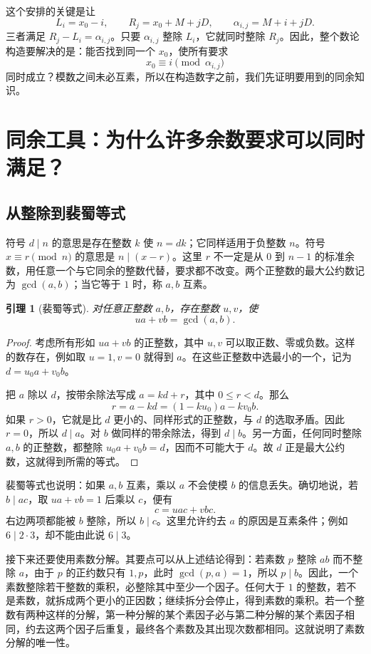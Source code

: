 \documentclass[UTF8,a4paper,oneside,openany,fontset=fandol,zihao=-4]{ctexbook}
\theoremstyle{guide}
\newtheorem{lemma}[theorem]{引理}
\begin{document}
这个安排的关键是让
\[
L_i=x_0-i,\qquad R_j=x_0+M+jD,\qquad
\alpha_{i,j}=M+i+jD.
\]
三者满足 $R_j-L_i=\alpha_{i,j}$。只要 $\alpha_{i,j}$ 整除 $L_i$，它就同时整除 $R_j$。因此，整个数论构造要解决的是：能否找到同一个 $x_0$，使所有要求
\[
x_0\equiv i\pmod{\alpha_{i,j}}
\]
同时成立？模数之间未必互素，所以在构造数字之前，我们先证明要用到的同余知识。

\section{同余工具：为什么许多余数要求可以同时满足？}\label{up:crt-tools}

\subsection{从整除到裴蜀等式}

符号 $d\mid n$ 的意思是存在整数 $k$ 使 $n=dk$；它同样适用于负整数 $n$。符号 $x\equiv r\pmod n$ 的意思是 $n\mid(x-r)$。这里 $r$ 不一定是从 $0$ 到 $n-1$ 的标准余数，用任意一个与它同余的整数代替，要求都不改变。两个正整数的最大公约数记为 $\gcd(a,b)$；当它等于 $1$ 时，称 $a,b$ 互素。

\begin{lemma}[裴蜀等式]\label{up:bezout}
对任意正整数 $a,b$，存在整数 $u,v$，使
\[
ua+vb=\gcd(a,b).
\]
\end{lemma}

\begin{proof}
考虑所有形如 $ua+vb$ 的正整数，其中 $u,v$ 可以取正数、零或负数。这样的数存在，例如取 $u=1,v=0$ 就得到 $a$。在这些正整数中选最小的一个，记为 $d=u_0a+v_0b$。

把 $a$ 除以 $d$，按带余除法写成 $a=kd+r$，其中 $0\leq r<d$。那么
\[
r=a-kd=(1-ku_0)a-kv_0b.
\]
如果 $r>0$，它就是比 $d$ 更小的、同样形式的正整数，与 $d$ 的选取矛盾。因此 $r=0$，所以 $d\mid a$。对 $b$ 做同样的带余除法，得到 $d\mid b$。另一方面，任何同时整除 $a,b$ 的正整数，都整除 $u_0a+v_0b=d$，因而不可能大于 $d$。故 $d$ 正是最大公约数，这就得到所需的等式。
\end{proof}

裴蜀等式也说明：如果 $a,b$ 互素，乘以 $a$ 不会使模 $b$ 的信息丢失。确切地说，若 $b\mid ac$，取 $ua+vb=1$ 后乘以 $c$，便有
\[
c=uac+vbc.
\]
右边两项都能被 $b$ 整除，所以 $b\mid c$。这里允许约去 $a$ 的原因是互素条件；例如 $6\mid2\cdot3$，却不能由此说 $6\mid3$。

接下来还要使用素数分解。其要点可以从上述结论得到：若素数 $p$ 整除 $ab$ 而不整除 $a$，由于 $p$ 的正约数只有 $1,p$，此时 $\gcd(p,a)=1$，所以 $p\mid b$。因此，一个素数整除若干整数的乘积，必整除其中至少一个因子。任何大于 $1$ 的整数，若不是素数，就拆成两个更小的正因数；继续拆分会停止，得到素数的乘积。若一个整数有两种这样的分解，第一种分解的某个素因子必与第二种分解的某个素因子相同，约去这两个因子后重复，最终各个素数及其出现次数都相同。这就说明了素数分解的唯一性。
\end{document}
